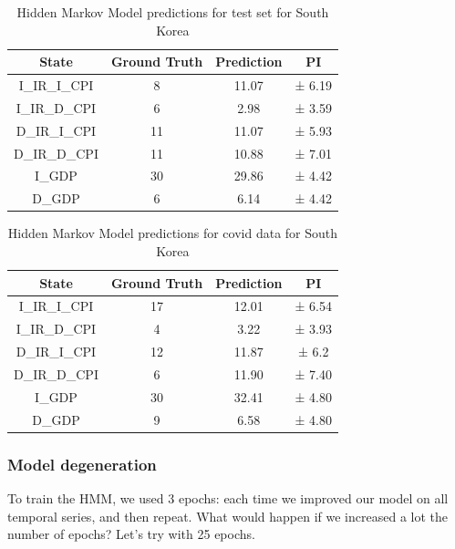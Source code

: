 \begin{table}[H]
  \centering
  \begin{tabular}{|c|c|c|c|}
    \hline
    State         & Ground Truth & Prediction & PI      \\
    \hline
    I\_IR\_I\_CPI & 8           & 11.07 & ± 6.19 \\
    I\_IR\_D\_CPI & 6            & 2.98 & ± 3.59  \\
    D\_IR\_I\_CPI & 11            & 11.07 & ± 5.93 \\
    D\_IR\_D\_CPI & 11          & 10.88 & ± 7.01 \\
    I\_GDP        & 30           & 29.86 & ± 4.42 \\
    D\_GDP        & 6            & 6.14 & ± 4.42 \\
    \hline
  \end{tabular}
  \label{tab:sk_test}
  \caption{Hidden Markov Model predictions for test set for South Korea}
\end{table}

\begin{table}[H]
  \centering
  \begin{tabular}{|c|c|c|c|}
    \hline
    State         & Ground Truth & Prediction & PI     \\
    \hline
    I\_IR\_I\_CPI & 17            & 12.01 & ± 6.54 \\
    I\_IR\_D\_CPI & 4            & 3.22 & ± 3.93 \\
    D\_IR\_I\_CPI & 12            & 11.87 & ± 6.2 \\
    D\_IR\_D\_CPI & 6           & 11.90 & ± 7.40 \\
    I\_GDP        & 30           & 32.41 & ± 4.80 \\
    D\_GDP        & 9            & 6.58 & ± 4.80 \\
    \hline
  \end{tabular}
  \label{tab:sk_covid}
  \caption{Hidden Markov Model predictions for covid data for South Korea}
\end{table}

\subsubsection*{Model degeneration}
To train the HMM, we used 3 epochs: each time we improved our model on all temporal series, and then repeat. What would happen if we increased a lot the number of epochs? Let's try with 25 epochs.

